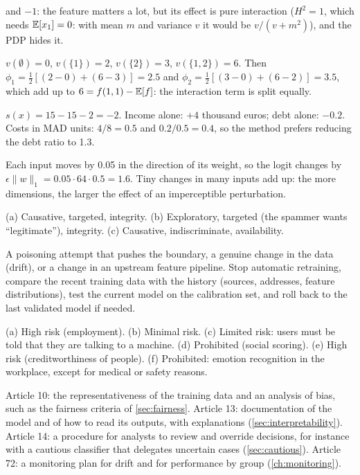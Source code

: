 \begin{description}[font=\bfseries,leftmargin=0pt,itemsep=5pt]
        and $-1$: the feature matters a lot, but its effect is pure interaction ($H^2=1$, which needs $\mathbb{E}[x_1]=0$: with mean $m$ and variance $v$
        it would be $v/(v+m^2)$), and the PDP hides it.
  \item[\ref{exr3:shapley}] $v(\emptyset)=0$, $v(\{1\})=2$, $v(\{2\})=3$, $v(\{1,2\})=6$. Then
        $\phi_1=\frac12[(2-0)+(6-3)]=2.5$ and $\phi_2=\frac12[(3-0)+(6-2)]=3.5$, which add up to
        $6=f(1,1)-\mathbb{E}[f]$: the interaction term is split equally.
  \item[\ref{exr3:cf}] $s(x)=15-15-2=-2$. Income alone: $+4$ thousand euros; debt alone: $-0.2$. Costs in MAD
        units: $4/8=0.5$ and $0.2/0.5=0.4$, so the method prefers reducing the debt ratio to 1.3.
  \item[\ref{exr3:fgsm}] Each input moves by 0.05 in the direction of its weight, so the logit changes by
        $\epsilon\|w\|_1=0.05\cdot64\cdot0.5=1.6$. Tiny changes in many inputs add up: the more dimensions, the
        larger the effect of an imperceptible perturbation.
  \item[\ref{exr3:taxonomy}] (a) Causative, targeted, integrity. (b) Exploratory, targeted (the spammer
        wants ``legitimate''), integrity. (c) Causative, indiscriminate, availability.
  \item[\ref{exr3:monitor}] A poisoning attempt that pushes the boundary, a genuine change in the data
        (drift), or a change in an upstream feature pipeline. Stop automatic retraining, compare the recent
        training data with the history (sources, addresses, feature distributions), test the current model
        on the calibration set, and roll back to the last validated model if needed.
  \item[\ref{exr3:aiacttiers}] (a) High risk (employment). (b) Minimal risk. (c) Limited risk: users must be told that they are
        talking to a machine. (d) Prohibited (social scoring). (e) High risk (creditworthiness of people). (f) Prohibited:
        emotion recognition in the workplace, except for medical or safety reasons.
  \item[\ref{exr3:aiactplan}] Article 10: the representativeness of the training data and an analysis of bias, such as the
        fairness criteria of \cref{sec:fairness}. Article 13: documentation of the model and of how to read its outputs, with
        explanations (\cref{sec:interpretability}). Article 14: a procedure for analysts to review and override decisions, for
        instance with a cautious classifier that delegates uncertain cases (\cref{sec:cautious}). Article 72: a monitoring plan
        for drift and for performance by group (\cref{ch:monitoring}).
\end{description}

